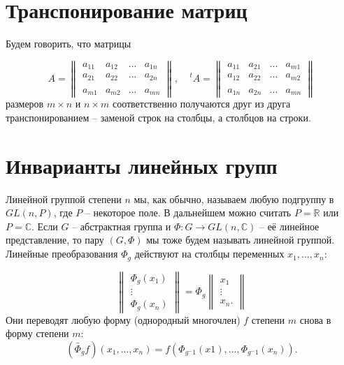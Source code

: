 \documentclass[a4paper, 12pt]{extarticle} %
\begin{document}
\clearpage
\section*{Транспонирование матриц}
Будем говорить, что матрицы

\begin{equation}
    A =
    \begin{Vmatrix}
        a_{11} & a_{12} & ... & a_{1n} \\
        a_{21} & a_{22} & ... & a_{2n} \\
        \\
        a_{m1} & a_{m2} & ... & a_{mn}
    \end{Vmatrix},
    ~~~~~
    ^tA =
    \begin{Vmatrix}
        a_{11} & a_{21} & ... & a_{m1} \\
        a_{12} & a_{22} & ... & a_{m2} \\
        \\
        a_{1n} & a_{2n} & ... & a_{mn}
    \end{Vmatrix}
\end{equation}
размеров $m \times n$ и $n \times m$ соответственно получаются друг из друга транспонированием -- заменой строк на столбцы, а столбцов на строки.

\clearpage
\section*{Инварианты линейных групп}
Линейной группой степени $n$ мы, как обычно, называем любую подгруппу в $GL(n, P)$, где $P$ -- некоторое поле. В дальнейшем можно считать $P = \mathbb{R}$ или $P = \mathbb{C}$. Если $G$ -- абстрактная группа и $\Phi : G \to GL(n, \mathbb{C})$ -- её линейное представление, то пару $(G, \Phi)$ мы тоже будем называть линейной группой. Линейные преобразования $\Phi_g$ действуют на столбцы переменных $x_1,...,x_n$:

\begin{equation}
    \begin{Vmatrix}
        \Phi_g(x_1) \\
        \vdots      \\
        \Phi_g(x_n)
    \end{Vmatrix}
    = \Phi_g
    \begin{Vmatrix}
        x_1    \\
        \vdots \\
        x_n.
    \end{Vmatrix}
\end{equation}
Они переводят любую форму (однородный многочлен) $f$ степени $m$ снова в форму степени $m$:
\begin{equation}
    (\widetilde{\Phi_g}f)(x_1, ..., x_n) = f(\Phi_{g^-1}(x1), ..., \Phi_{g^-1}(x_n)).
\end{equation}
\end{document}
